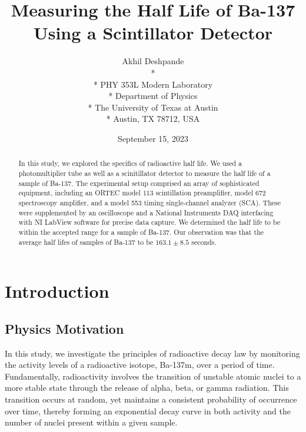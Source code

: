 \documentclass[10pt,letterpaper,onecolumn]{article}
\begin{document}
\title{\Large\bf Measuring the Half Life of Ba-137 Using a Scintillator Detector}
\author{
 Akhil Deshpande \\*
  \\*
 PHY 353L Modern Laboratory \\*
 Department of Physics \\*
 The University of Texas at Austin \\*
 Austin, TX 78712, USA
}
\date{September 15, 2023}



\maketitle
\begin{abstract}

  In this study, we explored the specifics of radioactive half life. We used a photomultiplier
  tube as well as a scinitillator detector to measure the half life of a sample of Ba-137.
  The experimental setup comprised an array of sophisticated equipment, 
  including an ORTEC model 113 scintillation preamplifier, model 672 spectroscopy 
  amplifier, and a model 553 timing single-channel analyzer (SCA). 
  These were supplemented by an oscilloscope and a National 
  Instruments DAQ interfacing with NI LabView software for precise data capture.
  We determined the half life to be within the accepted range for a sample of Ba-137.
  Our observation was that the average half lifes of samples of Ba-137 to be 
  $163.1 \pm 8.5$ seconds.

 

\end{abstract}
\section{Introduction}
\subsection{Physics Motivation}
In this study, we investigate the principles of radioactive decay 
law by monitoring the activity levels of a radioactive isotope, Ba-137m, 
over a period of time. Fundamentally, radioactivity involves the transition 
of unstable atomic nuclei to a more stable state through the release of alpha, 
beta, or gamma radiation. This transition occurs at random, yet maintains a consistent 
probability of occurrence over time, thereby forming an exponential decay curve in both
 activity and the number of nuclei present within a given sample.
\end{document}
